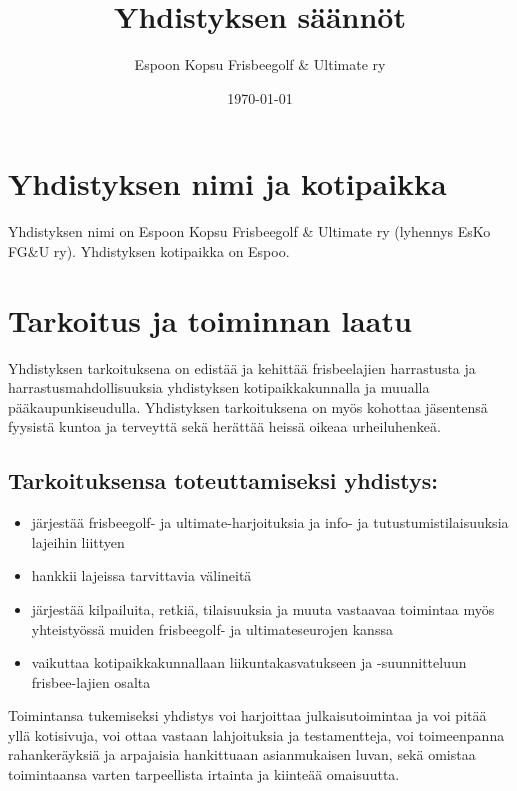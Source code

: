 \documentclass[a4paper, 12pt, finnish]{scrartcl}
\title{Yhdistyksen säännöt}
\author{Espoon Kopsu Frisbeegolf \& Ultimate ry}
\date{\today}
\begin{document}
\maketitle
\newpage

\tableofcontents
\newpage

\section{Yhdistyksen nimi ja kotipaikka}
Yhdistyksen nimi on Espoon Kopsu Frisbeegolf \& Ultimate ry (lyhennys EsKo FG\&U ry).
Yhdistyksen kotipaikka on Espoo.

\section{Tarkoitus ja toiminnan laatu}
Yhdistyksen tarkoituksena on edistää ja kehittää frisbeelajien harrastusta ja harrastusmahdollisuuksia yhdistyksen kotipaikkakunnalla ja muualla pääkaupunkiseudulla.
Yhdistyksen tarkoituksena on myös kohottaa jäsentensä fyysistä kuntoa ja terveyttä sekä herättää heissä oikeaa urheiluhenkeä.

\subsection*{Tarkoituksensa toteuttamiseksi yhdistys:}
\begin{itemize}
  \item järjestää frisbeegolf- ja ultimate-harjoituksia ja info- ja tutustumistilaisuuksia lajeihin liittyen
  \item hankkii lajeissa tarvittavia välineitä
  \item järjestää kilpailuita, retkiä, tilaisuuksia ja muuta vastaavaa toimintaa myös yhteistyössä muiden frisbeegolf- ja ultimateseurojen kanssa
  \item vaikuttaa kotipaikkakunnallaan liikuntakasvatukseen ja -suunnitteluun frisbee-lajien osalta
\end{itemize}

Toimintansa tukemiseksi yhdistys voi harjoittaa julkaisutoimintaa ja voi pitää yllä kotisivuja,
voi ottaa vastaan lahjoituksia ja testamentteja,
voi toimeenpanna rahankeräyksiä ja arpajaisia hankittuaan asianmukaisen luvan, sekä omistaa toimintaansa varten tarpeellista irtainta ja kiinteää omaisuutta.
\end{document}
